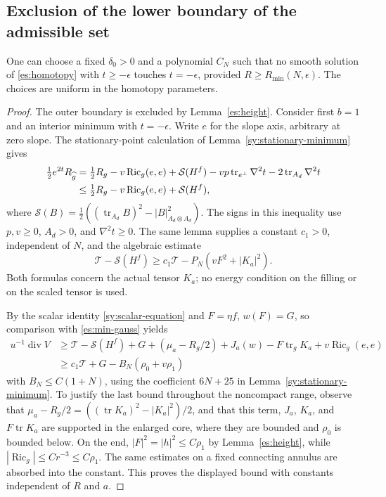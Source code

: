 \subsection{Exclusion of the lower boundary of the admissible set}

\begin{lemma}\label{es:floor}
One can choose a fixed $\delta_0>0$ and a polynomial $C_N$ such that
no smooth solution of \eqref{es:homotopy} with $t\ge-\epsilon$
touches $t=-\epsilon$, provided $R\ge R_{\min}(N,\epsilon)$.
The choices are uniform in the homotopy parameters.
\end{lemma}

\begin{proof}
The outer boundary is excluded by Lemma~\ref{es:height}.
Consider first $b=1$ and an interior minimum with $t=-\epsilon$.
Write $e$ for the slope axis, arbitrary at zero slope.
The stationary-point calculation of
Lemma~\ref{sy:stationary-minimum} gives
\begin{align}
 \tfrac12e^{2t}R_{\widehat g}
 &=\tfrac12R_g-v\operatorname{Ric}_g(e,e)
       +\mathcal S(H^f)
       -vp\operatorname{tr}_{e^\perp}\nabla^2t
       -2\operatorname{tr}_{A_d}\nabla^2t
 \notag\\
 &\le\tfrac12R_g-v\operatorname{Ric}_g(e,e)
       +\mathcal S(H^f),                                      \label{es:min-gauss}
\end{align}
where
$\mathcal S(B)=\tfrac12((\operatorname{tr}_{A_d}B)^2
-|B|^2_{A_d\otimes A_d})$.
The signs in this inequality use $p,v\ge0$, $A_d>0$, and
$\nabla^2t\ge0$.
The same lemma supplies a constant $c_1>0$, independent of $N$, and
the algebraic estimate
\begin{equation}\label{es:min-subtraction}
 \mathcal T-\mathcal S(H^f)
       \ge c_1\mathcal T-P_N(vF^2+|K_a|^2).
\end{equation}
Both formulas concern the actual tensor $K_a$; no energy condition on
the filling or on the scaled tensor is used.

By the scalar identity \eqref{sy:scalar-equation} and $F=\eta f$,
$w(F)=G$, so comparison with \eqref{es:min-gauss} yields
\begin{align*}
 u^{-1}\operatorname{div}V
 &\ge \mathcal T-\mathcal S(H^f)+G
       +(\mu_a-R_g/2)+J_a(w)-F\operatorname{tr}_gK_a
       +v\operatorname{Ric}_g(e,e)\\
 &\ge c_1\mathcal T+G-B_N(\rho_0+v\rho_1)
\end{align*}
with $B_N\le C(1+N)$, using the coefficient $6N+25$ in
Lemma~\ref{sy:stationary-minimum}.  To justify the last bound throughout the
noncompact range, observe that
$\mu_a-R_g/2=((\operatorname{tr}K_a)^2-|K_a|^2)/2$, and that this
term, $J_a$, $K_a$, and $F\operatorname{tr}K_a$ are supported in the
enlarged core, where they are bounded and $\rho_0$ is bounded below.
On the end, $|F|^2=|h|^2\le C\rho_1$ by
Lemma~\ref{es:height}, while
$|\operatorname{Ric}_g|\le C r^{-3}\le C\rho_1$.
The same estimates on a fixed connecting annulus are absorbed into
the constant.  This proves the displayed bound with constants
independent of $R$ and $a$.


\end{proof}
